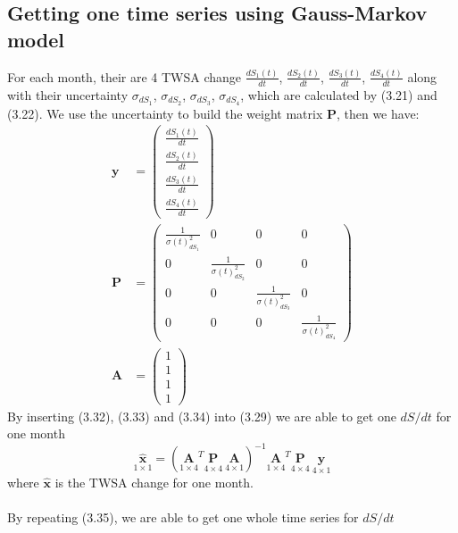 \subsection{Getting one time series using Gauss-Markov model}\label{section:oneseries}
For each month, their are 4 TWSA change $\frac{dS_1(t)}{dt}$, $\frac{dS_2(t)}{dt}$, $\frac{dS_3(t)}{dt}$, $\frac{dS_4(t)}{dt}$ along with their uncertainty $\sigma_{dS_1}$, $\sigma_{dS_2}$, $\sigma_{dS_3}$, $\sigma_{dS_4}$, which are calculated by (3.21) and (3.22). We use the uncertainty to build the weight matrix $\bm{P}$, then we have:
\begin{align}
\bm{y} &= \begin{pmatrix}
\frac{dS_1(t)}{dt}\\
\frac{dS_2(t)}{dt}\\
\frac{dS_3(t)}{dt}\\
\frac{dS_4(t)}{dt}
\end{pmatrix} \\
\bm{P} &= \begin{pmatrix}
\frac{1}{\sigma(t)_{dS_1}^2} & 0 & 0 & 0 \\
0 & \frac{1}{\sigma(t)_{dS_2}^2} & 0 & 0 \\
0 & 0 & \frac{1}{\sigma(t)_{dS_3}^2} & 0 \\
0 & 0 & 0 & \frac{1}{\sigma(t)_{dS_4}^2}
\end{pmatrix}\\
\bm{A} &= \begin{pmatrix}
1\\
1\\
1\\
1
\end{pmatrix}
\end{align}
By inserting (3.32), (3.33) and (3.34) into (3.29) we are able to get one $dS/dt$ for one month
\begin{equation}
\underset{1 \times 1}{\hat{\bm{x}}} = (\underset{1 \times 4}{\bm{A}}^T \underset{4 \times 4}{\bm{P}} \  \underset{4 \times 1}{\bm{A}})^{-1} \underset{1 \times 4}{\bm{A}}^T \underset{4 \times 4}{\bm{P}} \  \underset{4 \times 1}{\bm{y}}
\end{equation}
where $\hat{\bm{x}}$ is the TWSA change for one month.\\\\
By repeating (3.35), we are able to get one whole time series for $dS / dt$
